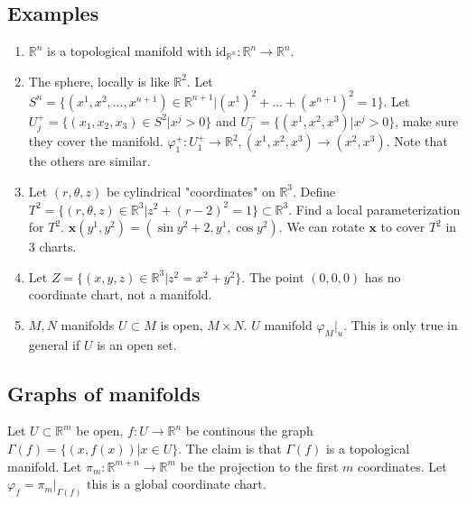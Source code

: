 \documentclass[a4paper]{article}
\begin{document}
\subsection*{Examples}
\begin{enumerate}
    \item
    $\mathds{R}^n$ is a topological manifold with $\text{id}_{\mathds{R}^n}: \mathds{R}^n \rightarrow \mathds{R}^n$. 
    \item
        The sphere, locally is like $\mathds{R}^2$. Let $S^n = \{(x^1, x^2, \dots, x^{n+1}) \in \mathds{R}^{n+1} | (x^1)^2 + \dots + (x^{n+1})^2 = 1\}$. Let $U_j^+  = \{(x_1, x_2, x_3) \in S^2 | x^j > 0\}$ and $U_j^- = \{(x^1, x^2, x^3) | x^j > 0\}$, make sure they cover the manifold. $\varphi_1^+: U_1^+ \rightarrow \mathds{R}^2, (x^1, x^2, x^3) \rightarrow (x^2, x^3)$. Note that the others are similar.
    \item Let $(r, \theta, z)$ be cylindrical "coordinates" on $\mathds{R}^3$. Define $T^2 = \{(r,\theta, z) \in \mathds{R}^3 | z^2 + (r-2)^2 = 1\} \subset \mathds{R}^3$. Find a local parameterization for $T^2$. $\mathbf{x}(y^1,y^2) = (\sin y^2 + 2,y^1, \cos y^2)$. We can rotate $\mathbf{x}$ to cover $T^2$ in 3 charts.
    \item Let $Z = \{(x,y,z) \in \mathds{R}^3 | z^2 = x^2 + y^2\}.$ The point $(0,0,0)$ has no coordinate chart, not a manifold.
    \item $M,N$ manifolds $U \subset M$  is open, $M \times N$. $U$ manifold  $\varphi_M|_u$. This is only true in general if $U$ is an open set.
\end{enumerate}

\subsection*{Graphs of manifolds}
Let $U \subset \mathds{R}^m$ be open, $f: U \rightarrow \mathds{R}^n$ be continous the graph $\Gamma(f) = \{(x, f(x)) | x \in U\}$. The claim is that $\Gamma(f)$ is a topological manifold. Let $\pi_m : \mathds{R}^{m+n} \rightarrow \mathds{R}^m$ be the projection to the first $m$ coordinates. Let $\varphi_f = \pi_m |_{\Gamma(f)}$ this is a global coordinate chart.
\end{document}
